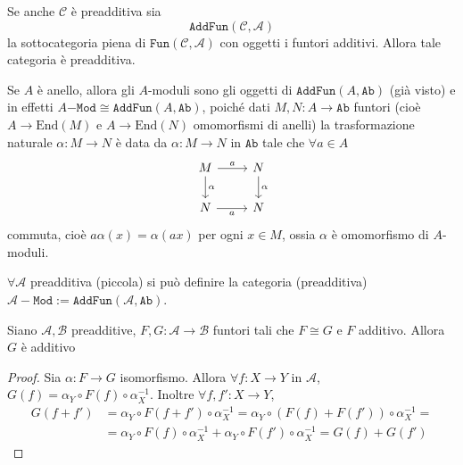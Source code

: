 Se anche \(\mathcal{C}\) è preadditiva sia 
\[
  \mathtt{AddFun}{(\mathcal{C}, \mathcal{A})}
\]
la sottocategoria piena di \(\mathtt{Fun}{(\mathcal{C}, \mathcal{A})}\) con 
oggetti i funtori additivi. Allora tale categoria è preadditiva.

\begin{example}{}
    Se \(A\) è anello, allora gli \(A\)-moduli sono gli oggetti di \(\mathtt{AddFun}{(A, \mathtt{Ab})}\) (già visto)
    e in effetti \(A\mathtt{-Mod} \cong \mathtt{AddFun}{(A, \mathtt{Ab})}\),
    poiché dati \(M, N : A \to \mathtt{Ab}\) funtori (cioè \(A \to \mathrm{End}{(M)}\) e \(A \to \mathrm{End}{(N)}\) omomorfismi di anelli) la trasformazione naturale \(\alpha : M \to N\) è data da
    \(\alpha : M \to N\) in \(\mathtt{Ab}\) tale che \(\forall a \in A\) 
\[\begin{tikzcd}
	{M} & {N} \\
	{N} & {N}
	\arrow["{a}", from=1-1, to=1-2]
	\arrow["{\alpha}", from=1-1, to=2-1]
	\arrow["{\alpha}", from=1-2, to=2-2]
	\arrow["{a}"', from=2-1, to=2-2]
\end{tikzcd}\]
commuta, cioè \(a \alpha {(x)} = \alpha {(a x)}\) per ogni \(x \in M\), ossia \(
\alpha \) è omomorfismo di \(A\)-moduli.
\end{example}
\begin{remark}{}
    \(\forall \mathcal{A}\) preadditiva (piccola) si può definire la categoria
    (preadditiva) \(\mathcal{A-}\mathtt{Mod} := \mathtt{AddFun}{(\mathcal{A}, \mathtt{Ab})}\).
\end{remark}
\begin{proposition}{}
    Siano \(\mathcal{A}, \mathcal{B}\) preadditive, \(F, G : \mathcal{A} \to
    \mathcal{B}\) funtori tali che \(F \cong G\) e \(F\) additivo. Allora \(G\)
    è additivo
\end{proposition}
\begin{proof}{}
    Sia \(\alpha : F \to G\) isomorfismo. Allora \(\forall  f : X \to Y\) in \(\mathcal{A}\), 
    \(G{(f)} = \alpha_Y \circ F{(f)} \circ \alpha_X^{-1}\).
    Inoltre \(\forall f, f' : X \to Y\),
    \begin{align*}G{(f + f')} &= \alpha_Y \circ F{(f +
    f')} \circ \alpha_X^{-1} = \alpha_Y \circ {(F{(f)} + F{(f')})} \circ \alpha_X^{-1} = \\
    &= \alpha_Y \circ F{(f)} \circ \alpha_X^{-1} + \alpha_Y \circ F{(f')} \circ
    \alpha_X^{-1} = G{(f)} + G{(f')}
\end{align*}
\end{proof}

